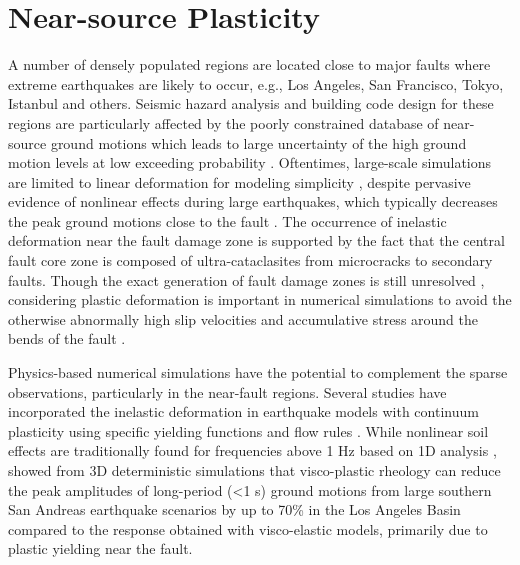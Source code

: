 \section{Near-source Plasticity}

A number of densely populated regions are located close to major faults where extreme earthquakes are likely to occur, e.g., Los Angeles, San Francisco, Tokyo, Istanbul and others. Seismic hazard analysis and building code design for these regions are particularly affected by the poorly constrained database of near-source ground motions which leads to large uncertainty of the high ground motion levels at low exceeding probability .  Oftentimes, large-scale simulations are limited to linear deformation for modeling simplicity \citep{olsen20083d,molnar2014earthquake}, despite pervasive evidence of nonlinear effects during large earthquakes, which typically decreases the peak ground motions close to the fault \citep{andrewsPhysicalLimitsGround2007,ma2008physical,duanSensitivityStudyPhysical2010,templetonDynamicRuptureBranched2010,dunhamEarthquakeRupturesStrongly2011}. The occurrence of inelastic deformation near the fault damage zone is supported by the fact that the central fault core zone is composed of ultra-cataclasites from microcracks to secondary faults. Though the exact generation of fault damage zones is still unresolved \citep{mitchellNatureOriginOfffault2009}, considering plastic deformation is important in numerical simulations to avoid the otherwise abnormally high slip velocities and accumulative stress around the bends of the fault \citep{nodaEarthquakeRupturesThermal2009,dunhamEarthquakeRupturesStrongly2011a}.

Physics-based numerical simulations have the potential to complement the sparse observations, particularly in the near-fault regions.
Several studies have incorporated the inelastic deformation in earthquake models with continuum plasticity using specific yielding functions and flow rules \citep[e.g. Mohr-Coulomb or Drucker–Prager formulations; ][]{andrewsRuptureDynamicsEnergy2005,maRuptureDynamicsBimaterial2008,duanSensitivityStudyPhysical2010,dunhamEarthquakeRupturesStrongly2011,rotenExpectedSeismicShaking2014}.
 While nonlinear soil effects are traditionally found for frequencies above 1 Hz based on 1D analysis \citep{fieldNonlinearSiteResponse1998},  \citet{rotenExpectedSeismicShaking2014} showed from 3D deterministic simulations that visco-plastic rheology can reduce the peak amplitudes of long-period (<1 s) ground motions from large southern San Andreas earthquake scenarios by up to 70\% in the Los Angeles Basin compared to the response obtained with visco-elastic models, primarily due to plastic yielding near the fault.
 
